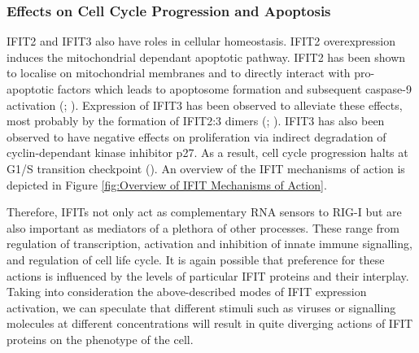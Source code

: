 \subsubsection{Effects on Cell Cycle Progression and Apoptosis} \label{Effects on Cell Cycle Progression and Apoptosis}
IFIT2 and IFIT3 also have roles in cellular homeostasis. IFIT2 overexpression induces the mitochondrial dependant apoptotic pathway. IFIT2 has been shown to localise on mitochondrial membranes and to directly interact with pro-apoptotic factors which leads to apoptosome formation and subsequent caspase-9 activation (\cite{Chen2017InhibitionApoptosis}; \cite{Diamond2013TheProteins}). Expression of IFIT3 has been observed to alleviate these effects, most probably by the formation of IFIT2:3 dimers (\cite{Mears2018BetterResponse}; \cite{Stawowczyk2011TheApoptosis}). IFIT3 has also been observed to have negative effects on proliferation via indirect degradation of cyclin-dependant kinase inhibitor p27. As a result, cell cycle progression halts at G1/S transition checkpoint (\cite{Xiao2006RIG-GProteins}). An overview of the IFIT mechanisms of action is depicted in Figure \ref{fig:Overview of IFIT Mechanisms of Action}.

Therefore, IFITs not only act as complementary RNA sensors to RIG-I but are also important as mediators of a plethora of other processes. These range from regulation of transcription, activation and inhibition of innate immune signalling, and regulation of cell life cycle. It is again possible that preference for these actions is influenced by the levels of particular IFIT proteins and their interplay. Taking into consideration the above-described modes of IFIT expression activation, we can speculate that different stimuli such as viruses or signalling molecules at different concentrations will result in quite diverging actions of IFIT proteins on the phenotype of the cell.

